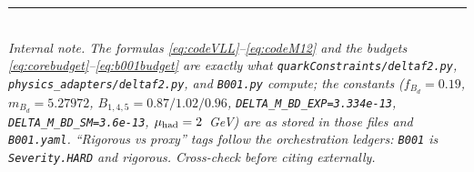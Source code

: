 \documentclass[11pt]{article}
\newcommand{\code}[1]{\texttt{#1}}
\theoremstyle{definition}
\begin{document}
\bigskip
\noindent\rule{\linewidth}{0.4pt}\\
\footnotesize
\emph{Internal note. The formulas \eqref{eq:codeVLL}--\eqref{eq:codeM12} and the
budgets \eqref{eq:corebudget}--\eqref{eq:b001budget} are exactly what
\code{quarkConstraints/deltaf2.py}, \code{physics\_adapters/deltaf2.py}, and
\code{B001.py} compute; the constants ($f_{B_d}=0.19$, $m_{B_d}=5.27972$,
$B_{1,4,5}=0.87/1.02/0.96$, \code{DELTA\_M\_BD\_EXP=3.334e-13},
\code{DELTA\_M\_BD\_SM=3.6e-13}, $\mu_{\rm had}=2$~GeV) are as stored in those
files and \code{B001.yaml}. ``Rigorous vs proxy'' tags follow the orchestration
ledgers: \code{B001} is \code{Severity.HARD} and rigorous. Cross-check before
citing externally.}
\end{document}
